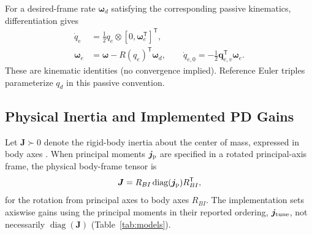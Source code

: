 \documentclass[letterpaper, 10 pt, conference]{ieeeconf}
\newcommand{\T}{^{\mathsf T}}
\begin{document}
For a desired-frame rate $\bm\omega_d$ satisfying the corresponding passive kinematics, differentiation gives
\begin{align}
 \dot q_e&=\tfrac12q_e\otimes[0,\bm\omega_e\T]\T,\\
 \bm\omega_e&=\bm\omega-R(q_e)\T\bm\omega_d,\qquad
 \dot q_{e,0}=-\tfrac12\bm q_{e,v}\T\bm\omega_e.
 \label{eq:errkin}
\end{align}
These are kinematic identities (no convergence implied). Reference Euler triples parameterize $q_d$ in this passive convention.

\subsection{Physical Inertia and Implemented PD Gains}
Let $\bm J\succ0$ denote the rigid-body inertia about the center of mass, expressed in body axes \cite{schaub2018amss}. When principal moments $\bm j_{\rm p}$ are specified in a rotated principal-axis frame, the physical body-frame tensor is
\begin{equation}
 \bm J=R_{BI}\operatorname{diag}(\bm j_{\rm p})R_{BI}\T,
 \label{eq:inertiaframe}
\end{equation}
for the rotation from principal axes to body axes $R_{BI}$. The implementation sets axiswise gains using the principal moments in their reported ordering, $\bm j_{\rm tune}$, not necessarily $\operatorname{diag}(\bm J)$ (Table~\ref{tab:models}).
\end{document}

